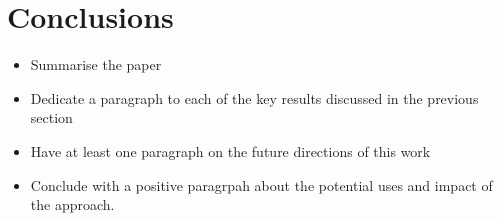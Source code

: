 \documentclass[%
 reprint,
 amsmath,amssymb,
 aps,
]{revtex4-2}
\begin{document}
\section{Conclusions}

\begin{itemize}
\item Summarise the paper
\item Dedicate a paragraph to each of the key results discussed in the previous
section
\item Have at least one paragraph on the future directions of this work
\item Conclude with a positive paragrpah about the potential uses and impact of
the approach.
\end{itemize}

\end{document}
